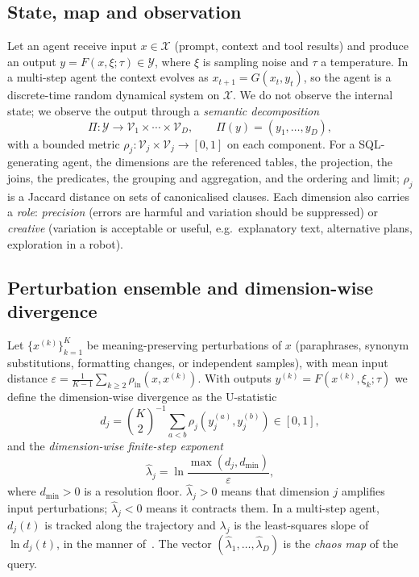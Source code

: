 \documentclass[preprint,12pt]{elsarticle}
\begin{document}
\subsection{State, map and observation}
Let an agent receive input $x\in\mathcal{X}$ (prompt, context and tool results) and produce an output $y=F(x,\xi;\tau)\in\mathcal{Y}$, where $\xi$ is sampling noise and $\tau$ a temperature. In a multi-step agent the context evolves as $x_{t+1}=G(x_t,y_t)$, so the agent is a discrete-time random dynamical system on $\mathcal{X}$. We do not observe the internal state; we observe the output through a \emph{semantic decomposition}
\begin{equation}
\Pi:\mathcal{Y}\to\mathcal{V}_1\times\cdots\times\mathcal{V}_D,\qquad \Pi(y)=(y_1,\dots,y_D),
\end{equation}
with a bounded metric $\rho_j:\mathcal{V}_j\times\mathcal{V}_j\to[0,1]$ on each component. For a SQL-generating agent, the dimensions are the referenced tables, the projection, the joins, the predicates, the grouping and aggregation, and the ordering and limit; $\rho_j$ is a Jaccard distance on sets of canonicalised clauses. Each dimension also carries a \emph{role}: \emph{precision} (errors are harmful and variation should be suppressed) or \emph{creative} (variation is acceptable or useful, e.g.\ explanatory text, alternative plans, exploration in a robot).

\subsection{Perturbation ensemble and dimension-wise divergence}
Let $\{x^{(k)}\}_{k=1}^{K}$ be meaning-preserving perturbations of $x$ (paraphrases, synonym substitutions, formatting changes, or independent samples), with mean input distance $\varepsilon=\frac{1}{K-1}\sum_{k\ge 2}\rho_{\mathrm{in}}(x,x^{(k)})$. With outputs $y^{(k)}=F(x^{(k)},\xi_k;\tau)$ we define the dimension-wise divergence as the U-statistic
\begin{equation}
d_j=\binom{K}{2}^{-1}\sum_{a<b}\rho_j\!\left(y^{(a)}_j,y^{(b)}_j\right)\in[0,1],
\label{eq:div}
\end{equation}
and the \emph{dimension-wise finite-step exponent}
\begin{equation}
\hat\lambda_j=\ln\frac{\max(d_j,d_{\min})}{\varepsilon},
\label{eq:lam}
\end{equation}
where $d_{\min}>0$ is a resolution floor. $\hat\lambda_j>0$ means that dimension $j$ amplifies input perturbations; $\hat\lambda_j<0$ means it contracts them. In a multi-step agent, $d_j(t)$ is tracked along the trajectory and $\lambda_j$ is the least-squares slope of $\ln d_j(t)$, in the manner of~\cite{rosenstein1993}. The vector $(\hat\lambda_1,\dots,\hat\lambda_D)$ is the \emph{chaos map} of the query.
\end{document}
